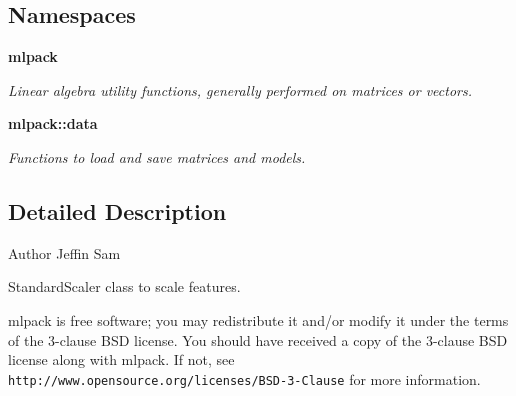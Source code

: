 \subsection*{Namespaces}
\begin{DoxyCompactItemize}
\item 
 \textbf{ mlpack}
\begin{DoxyCompactList}\small\item\em Linear algebra utility functions, generally performed on matrices or vectors. \end{DoxyCompactList}\item 
 \textbf{ mlpack\+::data}
\begin{DoxyCompactList}\small\item\em Functions to load and save matrices and models. \end{DoxyCompactList}\end{DoxyCompactItemize}


\subsection{Detailed Description}
\begin{DoxyAuthor}{Author}
Jeffin Sam
\end{DoxyAuthor}
Standard\+Scaler class to scale features.

mlpack is free software; you may redistribute it and/or modify it under the terms of the 3-\/clause B\+SD license. You should have received a copy of the 3-\/clause B\+SD license along with mlpack. If not, see {\tt http\+://www.\+opensource.\+org/licenses/\+B\+S\+D-\/3-\/\+Clause} for more information. 